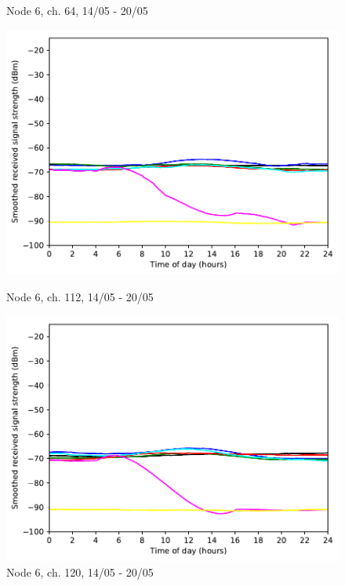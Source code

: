 \documentclass[a4paper, 11pt]{article}
\begin{document}
\begin{figure}[ht]
\begin{minipage}{0.47\textwidth}
	\caption{Node 6, ch. 64, 14/05 - 20/05}
	\label{node6_5ghz_traffic_chan64}
\end{minipage}\hfill
\begin{minipage}{0.47\textwidth}
    \centering
    \includegraphics[width=\textwidth]{images/5_GHz/cot-node6-student_2017-05-20_chan112_image.pdf}
    \caption{Node 6, ch. 112, 14/05 - 20/05}
    \label{node6_5ghz_traffic_chan112}
\end{minipage}\hfill
\begin{minipage}{0.47\textwidth}
    \centering
    \includegraphics[width=\textwidth]{images/5_GHz/cot-node6-student_2017-05-20_chan120_image.pdf}
    \caption{Node 6, ch. 120, 14/05 - 20/05}
    \label{node6_5ghz_traffic_chan120}
\end{minipage}\hfill
\end{figure}
\end{document}
